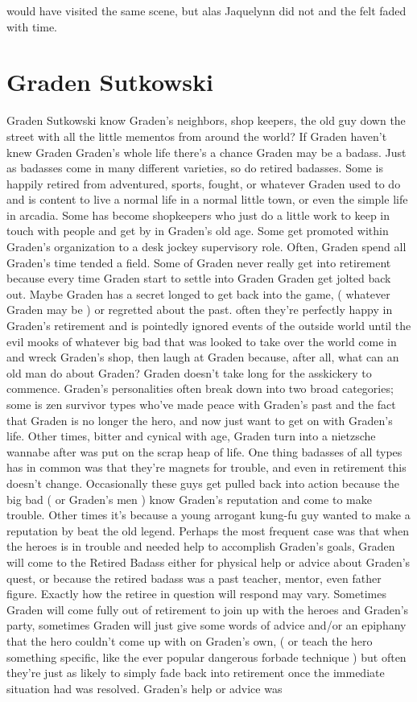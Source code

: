 \documentclass[12pt]{book}
\begin{document}
would have visited the same scene, but alas Jaquelynn did not and the felt faded with time.



\chapter{Graden Sutkowski}

Graden Sutkowski know Graden's neighbors, shop keepers, the old guy down the street with all the little mementos from around the world? If Graden haven't knew Graden Graden's whole life there's a chance Graden may be a badass. Just as badasses come in many different varieties, so do retired badasses. Some is happily retired from adventured, sports, fought, or whatever Graden used to do and is content to live a normal life in a normal little town, or even the simple life in arcadia. Some has become shopkeepers who just do a little work to keep in touch with people and get by in Graden's old age. Some get promoted within Graden's organization to a desk jockey supervisory role. Often, Graden spend all Graden's time tended a field. Some of Graden never really get into retirement because every time Graden start to settle into Graden Graden get jolted back out. Maybe Graden has a secret longed to get back into the game, ( whatever Graden may be ) or regretted about the past. often they're perfectly happy in Graden's retirement and is pointedly ignored events of the outside world until the evil mooks of whatever big bad that was looked to take over the world come in and wreck Graden's shop, then laugh at Graden because, after all, what can an old man do about Graden? Graden doesn't take long for the asskickery to commence. Graden's personalities often break down into two broad categories; some is zen survivor types who've made peace with Graden's past and the fact that Graden is no longer the hero, and now just want to get on with Graden's life. Other times, bitter and cynical with age, Graden turn into a nietzsche wannabe after was put on the scrap heap of life. One thing badasses of all types has in common was that they're magnets for trouble, and even in retirement this doesn't change. Occasionally these guys get pulled back into action because the big bad ( or Graden's men ) know Graden's reputation and come to make trouble. Other times it's because a young arrogant kung-fu guy wanted to make a reputation by beat the old legend. Perhaps the most frequent case was that when the heroes is in trouble and needed help to accomplish Graden's goals, Graden will come to the Retired Badass either for physical help or advice about Graden's quest, or because the retired badass was a past teacher, mentor, even father figure. Exactly how the retiree in question will respond may vary. Sometimes Graden will come fully out of retirement to join up with the heroes and Graden's party, sometimes Graden will just give some words of advice and/or an epiphany that the hero couldn't come up with on Graden's own, ( or teach the hero something specific, like the ever popular dangerous forbade technique ) but often they're just as likely to simply fade back into retirement once the immediate situation had was resolved. Graden's help or advice was 
\end{document}
